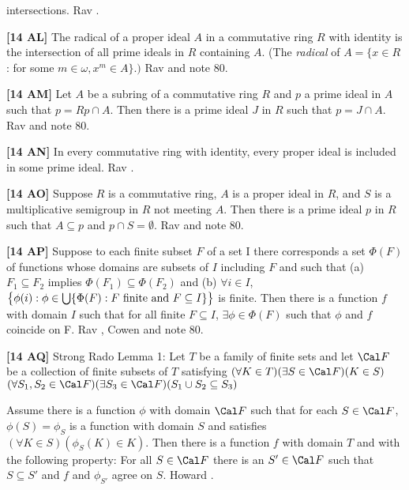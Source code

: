 intersections.  \ac{Rav} \cite{1977}.
\smallskip
\item{}{\bf [14 AL]}  The radical of a proper ideal $A$ in a commutative
ring $R$ with identity is the intersection of all prime ideals in $R$
containing $A$. (The {\it radical} of $A = \{x\in R$ : for some
$m\in\omega, x^{m}\in A\}.)$ \ac{Rav} \cite{1977} and note 80.
\smallskip
\item{}{\bf [14 AM]}  Let $A$ be a subring of a commutative ring $R$ and
$p$ a prime ideal in $A$ such that $p = Rp \cap A$.  Then there is  a
prime ideal $J$ in $R$ such that $p = J \cap A$. \ac{Rav} \cite{1977} and
note 80.
\smallskip
\item{}{\bf [14 AN]}  In every commutative ring  with  identity,  every
proper ideal is included in some prime ideal.  \ac{Rav} \cite{1977}.
\smallskip
\item{}{\bf [14 AO]}  Suppose $R$ is a commutative ring, $A$ is a
proper ideal in $R$, and $S$ is a multiplicative semigroup in $R$
not meeting $A$.  Then there is a prime ideal $p$  in $R$  such that
$A \subseteq  p$ and $p\cap S=\emptyset$. \ac{Rav} \cite{1977} and note 80.
\smallskip
\item{}{\bf [14 AP]}  Suppose to each finite subset $F$ of a set I there
corresponds a set $\Phi (F)$ of functions whose domains are  subsets
of $I$ including $F$ and such that (a) $F_{1}\subseteq F_{2}$ implies
$\Phi(F_{1})\subseteq\Phi(F_{2})$ and (b) $\forall i\in I$, $\bigl\{\phi(i)
: \phi\in\bigcup\{\Phi(F): F\hbox{ finite and }F\subseteq I\}\bigr\}$
is finite.  Then there is a function $f$ with domain $I$ such
that for all finite $F\subseteq I$, $\exists\phi\in\Phi(F)$
such that $\phi$ and $f$ coincide on F. \ac{Rav} \cite{1977}, \ac{Cowen}
\cite{1973} and note 80.
\smallskip
\item{}{\bf [14 AQ]}  Strong Rado Lemma 1: Let $T$ be a family of finite
sets and let ${\Cal F}$ be a collection of finite subsets of $T$
satisfying
 $(\forall K\in T)(\exists S\in{\Cal F})(K\in S)$
 $(\forall S_{1}, S_{2}\in{\Cal F})(\exists S_{3}\in
{\Cal F})(S_{1}\cup S_{2}\subseteq S_{3})$
\item{}Assume there is a function $\phi$ with domain ${\Cal F}$ such that
for each $S\in{\Cal F}$, $\phi(S) = \phi_{S}$ is a function with domain
$S$ and satisfies $(\forall K\in S)(\phi_{S}(K)\in K)$. Then there is a
function $f$ with domain $T$ and with the following property:  For all
$S\in{\Cal F}$ there is an $S'\in{\Cal F}$ such that $S\subseteq S'$ and
$f$ and $\phi_{S'}$ agree on $S$.  \ac{Howard} \cite{1993}.
